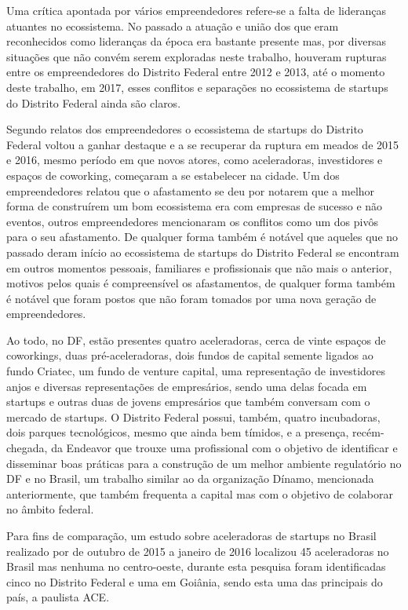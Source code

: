 Uma crítica apontada por vários empreendedores refere-se a falta de lideranças atuantes no ecossistema. No passado a atuação e união dos que eram reconhecidos como lideranças da época era bastante presente mas, por diversas situações que não convém serem exploradas neste trabalho, houveram rupturas entre os empreendedores do Distrito Federal entre 2012 e 2013, até o momento deste trabalho, em 2017, esses conflitos e separações no ecossistema de startups do Distrito Federal ainda são claros. 

Segundo relatos dos empreendedores o ecossistema de startups do Distrito Federal voltou a ganhar destaque e a se recuperar da ruptura em meados de 2015 e 2016, mesmo período em que novos atores, como aceleradoras, investidores e espaços de coworking, começaram a se estabelecer na cidade. Um dos empreendedores relatou que o afastamento se deu por notarem que a melhor forma de construírem um bom ecossistema era com empresas de sucesso e não eventos, outros empreendedores mencionaram os conflitos como um dos pivôs para o seu afastamento. De qualquer forma também é notável que aqueles que no passado deram início ao ecossistema de startups do Distrito Federal se encontram em outros momentos pessoais, familiares e profissionais que não mais o anterior, motivos pelos quais é compreensível os afastamentos, de qualquer forma também é notável que foram postos que não foram tomados por uma nova geração de empreendedores.

Ao todo, no DF, estão presentes quatro aceleradoras, cerca de vinte espaços de coworkings, duas pré-aceleradoras, dois fundos de capital semente ligados ao fundo Criatec, um fundo de venture capital, uma representação de investidores anjos e diversas representações de empresários, sendo uma delas focada em startups e outras duas de jovens empresários que também conversam com o mercado de startups. O Distrito Federal possui, também, quatro incubadoras, dois parques tecnológicos, mesmo que ainda bem tímidos, e a presença, recém-chegada, da Endeavor que trouxe uma profissional com o objetivo de identificar e disseminar boas práticas para a construção de um melhor ambiente regulatório no DF e no Brasil, um trabalho similar ao da organização Dínamo, mencionada anteriormente, que também frequenta a capital mas com o objetivo de colaborar no âmbito federal.

Para fins de comparação, um estudo sobre aceleradoras de startups no Brasil realizado por  de outubro de 2015 a janeiro de 2016 localizou 45 aceleradoras no Brasil mas nenhuma no centro-oeste, durante esta pesquisa foram identificadas cinco no Distrito Federal e uma em Goiânia, sendo esta uma das principais do país, a paulista ACE.

